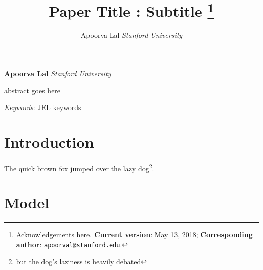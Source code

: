 \documentclass[12pt,]{article}
\title{Paper Title : Subtitle \thanks{Acknowledgements here. \textbf{Current version}: May 13, 2018;
\textbf{Corresponding author}:
\href{mailto:apoorval@stanford.edu}{\nolinkurl{apoorval@stanford.edu}}.}  }
\author{\Large Apoorva Lal\vspace{0.05in} \newline\normalsize\emph{Stanford University}  }
\date{}
\renewenvironment{abstract}
 {{%
    \setlength{\leftmargin}{0mm}
    \setlength{\rightmargin}{\leftmargin}%
  }%
  \relax}
 {\endlist}
\begin{document}
%



\maketitle

{%
\thispagestyle{plain}
{ \selectfont
\maketitle  %
}

\begin{center}
{
   \vskip 13.5pt\relax \normalsize\fontsize{14}{14}
\textbf{Apoorva Lal} \hskip 15pt \emph{\small Stanford University}   
}
\end{center}
}





\begin{abstract}

    \hbox{\vrule height .2pt width 39.14pc}

    \vskip 8.5pt %

\noindent abstract goes here


\vskip 8.5pt \noindent \emph{Keywords}: JEL keywords \par

    \hbox{\vrule height .2pt width 39.14pc}



\end{abstract}


\vskip 6.5pt

{
\hypersetup{linkcolor=black}
\setcounter{tocdepth}{3}
\tableofcontents
}

\newpage


\noindent \doublespacing \section{Introduction}\label{introduction}

\textcite{Deatonanalysishouseholdsurveys1997}

The quick brown fox jumped over the lazy dog\footnote{but the dog's
  laziness is heavily debated}.

\section{Model}\label{model}
\end{document}
